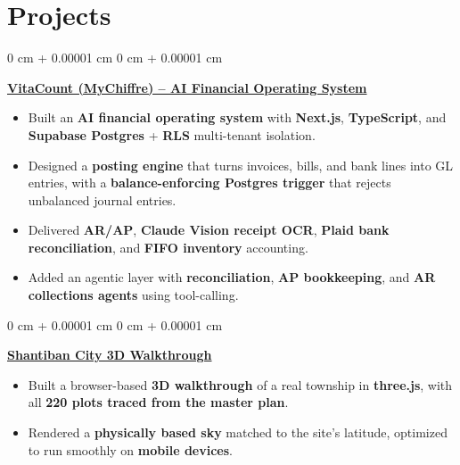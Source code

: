 \documentclass[10pt, letterpaper]{article}
\newenvironment{highlights}{
    \begin{itemize}[
        topsep=0.10 cm,
        parsep=0.10 cm,
        partopsep=0pt,
        itemsep=0pt,
        leftmargin=0 cm + 10pt
    ]
}{
    \end{itemize}
} %
\newenvironment{onecolentry}{
    \begin{adjustwidth}{
        0 cm + 0.00001 cm
    }{
        0 cm + 0.00001 cm
    }
}{
    \end{adjustwidth}
} %
\begin{document}
 \section{Projects}
\begin{onecolentry}
    \textbf{\href{https://vitacount.vercel.app}{VitaCount (MyChiffre) -- AI Financial Operating System}}
    \begin{highlights}
        \item Built an \textbf{AI financial operating system} with \textbf{Next.js}, \textbf{TypeScript}, and \textbf{Supabase Postgres} + \textbf{RLS} multi-tenant isolation.
        \item Designed a \textbf{posting engine} that turns invoices, bills, and bank lines into GL entries, with a \textbf{balance-enforcing Postgres trigger} that rejects unbalanced journal entries.
        \item Delivered \textbf{AR/AP}, \textbf{Claude Vision receipt OCR}, \textbf{Plaid bank reconciliation}, and \textbf{FIFO inventory} accounting.
        \item Added an agentic layer with \textbf{reconciliation}, \textbf{AP bookkeeping}, and \textbf{AR collections agents} using tool-calling.
    \end{highlights}
\end{onecolentry}
\vspace{0.20 cm}
\begin{onecolentry}
    \textbf{\href{https://walkthrough.mrityikaestates.com}{Shantiban City 3D Walkthrough}}
    \begin{highlights}
        \item Built a browser-based \textbf{3D walkthrough} of a real township in \textbf{three.js}, with all \textbf{220 plots traced from the master plan}.
        \item Rendered a \textbf{physically based sky} matched to the site's latitude, optimized to run smoothly on \textbf{mobile devices}.
    \end{highlights}
\end{onecolentry}
\vspace{0.20cm}
\end{document}
